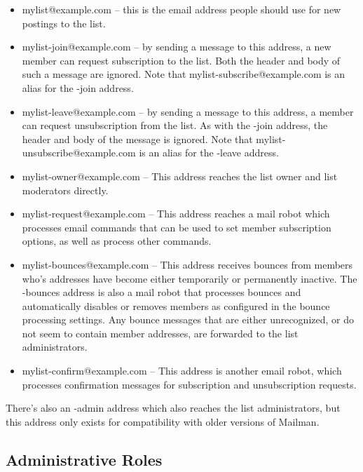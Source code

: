\documentclass{howto}
\begin{document}
\begin{itemize}
\item mylist@example.com -- this is the email address people should
      use for new postings to the list.

\item mylist-join@example.com -- by sending a message to this address,
      a new member can request subscription to the list.  Both the
       header and body of such a message are
      ignored.  Note that mylist-subscribe@example.com is an alias for
      the -join address.

\item mylist-leave@example.com -- by sending a message to this address,
      a member can request unsubscription from the list.  As with the
      -join address, the  header and body of the
      message is ignored.  Note that mylist-unsubscribe@example.com is
      an alias for the -leave address.

\item mylist-owner@example.com -- This address reaches the list owner
      and list moderators directly.

\item mylist-request@example.com -- This address reaches a mail robot
      which processes email commands that can be used to set member
      subscription options, as well as process other commands.

\item mylist-bounces@example.com -- This address receives bounces from
      members who's addresses have become either temporarily or
      permanently inactive.  The -bounces address is also a mail robot
      that processes bounces and automatically disables or removes
      members as configured in the bounce processing settings.  Any
      bounce messages that are either unrecognized, or do not seem to
      contain member addresses, are forwarded to the list
      administrators.

\item mylist-confirm@example.com -- This address is another email
      robot, which processes confirmation messages for subscription
      and unsubscription requests.
\end{itemize}

There's also an -admin address which also reaches the list
administrators, but this address only exists for compatibility with
older versions of Mailman.

\subsection{Administrative Roles}
\end{document}
